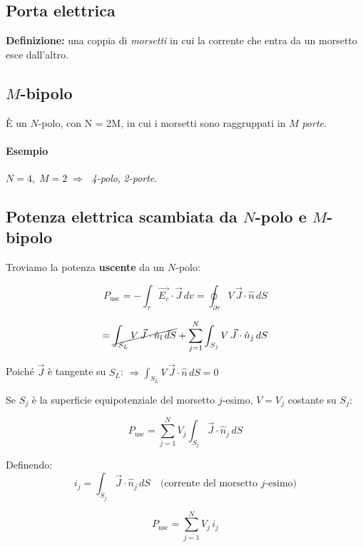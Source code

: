 \subsection*{Porta elettrica}
\textbf{Definizione:} una coppia di \textit{morsetti} in cui la corrente che entra da un morsetto esce dall’altro.

\subsection*{$M$-bipolo}
È un $N$-polo, con N = 2M, in cui i morsetti sono raggruppati in $M$ \textit{porte}.

\paragraph{Esempio}
$N=4,\; M=2 \;\Rightarrow\;$ \textit{4-polo}, \textit{2-porte}.

\subsection{Potenza elettrica scambiata da $N$-polo e $M$-bipolo}

Troviamo la potenza \textbf{uscente} da un $N$-polo:

\[
P_{\text{usc}} = - \int_{\tau} \vec{E_c} \cdot \vec{J}\, dv 
               = \oint_{\partial \tau} V \, \vec{J} \cdot \hat{n}\, dS
\]

\[
= \cancel{\int_{S_L} V\,\vec{J}\cdot\hat{n}_l\, dS}
  + \sum_{j=1}^{N} \int_{S_j} V\,\vec{J}\cdot\hat{n}_j\, dS
\]

Poiché $\vec{J}$ è tangente su $S_L$: $\Rightarrow \int_{S_L} V\,\vec{J}\cdot\hat{n}\, dS = 0$

Se $S_j$ è la superficie equipotenziale del morsetto $j$-esimo, $V = V_j$ costante su $S_j$:

\[
P_{\text{usc}} = \sum_{j=1}^{N} 
V_j \int_{S_j} \vec{J}\cdot\hat{n}_j\, dS
\]

Definendo:
\[
i_j = \int_{S_j} \vec{J}\cdot\hat{n}_j\, dS
\quad \text{(corrente del morsetto $j$-esimo)}
\]

\[
\boxed{
P_{\text{usc}} = \sum_{j=1}^{N} V_j\, i_j
}
\]


